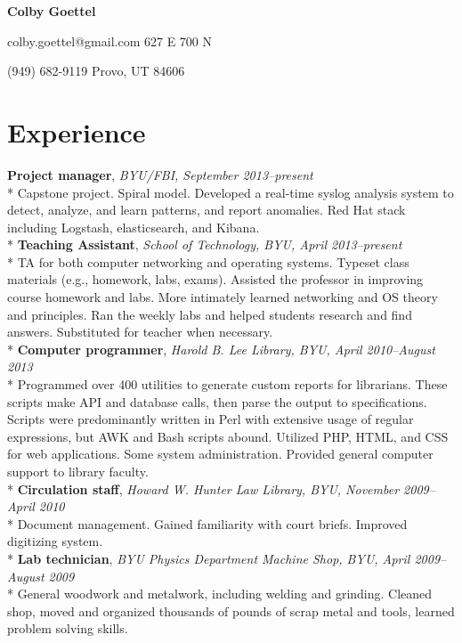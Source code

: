 \documentclass[10pt]{article}
\begin{document}
\begin{center}
    {\bfseries \huge Colby Goettel} \\
\end{center}
{\noindent colby.goettel@gmail.com \hfill 627 E 700 N}

{\noindent (949) 682-9119 \hfill Provo, UT 84606}

\section*{Experience}
\textbf{Project manager}, \textit{BYU/FBI, September 2013--present} \\*
{\indent Capstone project. Spiral model. Developed a real-time syslog analysis system to detect, analyze, and learn patterns, and report anomalies. Red Hat stack including Logstash, elasticsearch, and Kibana.} \\*
\textbf{Teaching Assistant}, \textit{School of Technology, BYU, April 2013--present} \\*
{\indent TA for both computer networking and operating systems. Typeset class materials (e.g., homework, labs, exams). Assisted the professor in improving course homework and labs. More intimately learned networking and OS theory and principles. Ran the weekly labs and helped students research and find answers. Substituted for teacher when necessary.} \\*
\textbf{Computer programmer}, \textit{Harold B. Lee Library, BYU, April 2010--August 2013} \\*
{\indent Programmed over 400 utilities to generate custom reports for librarians. These scripts make API and database calls, then parse the output to specifications. Scripts were predominantly written in Perl with extensive usage of regular expressions, but AWK and Bash scripts abound. Utilized PHP, HTML, and CSS for web applications. Some system administration. Provided general computer support to library faculty.} \\*
\textbf{Circulation staff}, \textit{Howard W. Hunter Law Library, BYU, November 2009--April 2010} \\*
{\indent Document management. Gained familiarity with court briefs. Improved digitizing system.} \\*
\textbf{Lab technician}, \textit{BYU Physics Department Machine Shop, BYU, April 2009--August 2009} \\*
{\indent General woodwork and metalwork, including welding and grinding. Cleaned shop, moved and organized thousands of pounds of scrap metal and tools, learned problem solving skills.}
\end{document}
